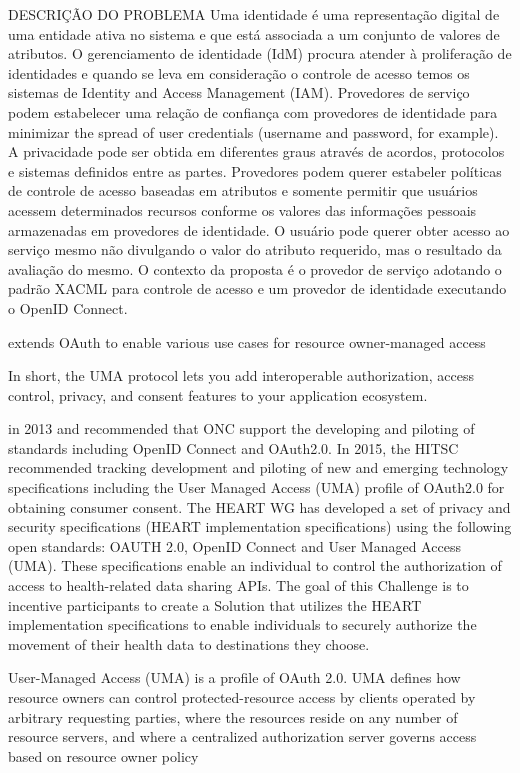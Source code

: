 DESCRIÇÃO DO PROBLEMA
Uma identidade é uma representação digital de uma entidade ativa no sistema e que está associada a um conjunto de valores de atributos. O gerenciamento de identidade (IdM) procura atender à proliferação de identidades e quando se leva em consideração o controle de acesso temos os sistemas de Identity and Access Management (IAM). Provedores de serviço podem estabelecer uma relação de confiança com provedores de identidade para minimizar the spread of user credentials (username and password, for example). A privacidade pode ser obtida em diferentes graus através de acordos, protocolos e sistemas definidos entre as partes. Provedores podem querer estabeler políticas de controle de acesso baseadas em atributos e somente permitir que usuários acessem determinados recursos conforme os valores das informações pessoais armazenadas em provedores de identidade. O usuário pode querer obter acesso ao serviço mesmo não divulgando o valor do atributo requerido, mas o resultado da avaliação do mesmo. O contexto da proposta é o provedor de serviço adotando o padrão XACML para controle de acesso e um provedor de identidade executando o OpenID Connect.


extends OAuth to enable various use cases for resource owner-managed access 

In short, the UMA protocol lets you add interoperable authorization, access control, privacy, and consent features to your application ecosystem.

in 2013 and recommended that ONC support the developing and piloting of standards including OpenID Connect and OAuth2.0. In 2015, the HITSC recommended tracking development and piloting of new and emerging technology specifications including the User Managed Access (UMA) profile of OAuth2.0 for obtaining consumer consent. The HEART WG has developed a set of privacy and security specifications (HEART implementation specifications) using the following open standards: OAUTH 2.0, OpenID Connect and User Managed Access (UMA). These specifications enable an individual to control the authorization of access to health-related data sharing APIs. The goal of this Challenge is to incentive participants to create a Solution that utilizes the HEART implementation specifications to enable individuals to securely authorize the movement of their health data to destinations they choose. 


User-Managed Access (UMA) is a profile of OAuth 2.0. UMA defines how resource owners can control protected-resource access by clients operated by arbitrary requesting parties, where the resources reside on any number of resource servers, and where a centralized authorization server governs access based on resource owner policy




